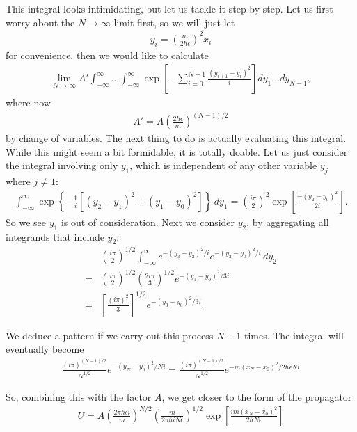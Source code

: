 \documentclass{book}
\theoremstyle{definition}
\newcommand{\f}[2]{\frac{#1}{#2}}
\newcommand{\lp}{\left(}
\newcommand{\rp}{\right)}
\newcommand{\lb}{\left[}
\newcommand{\rb}{\right]}
\newcommand{\lc}{\left\{}
\newcommand{\rc}{\right\}}
\begin{document}
This integral looks intimidating, but let us tackle it step-by-step. Let us first worry about the $N\to \infty$ limit first, so we will just let
\begin{align}
y_i = \lp \f{m}{2\hbar\epsilon}\rp^2 x_i
\end{align}
for convenience, then we would like to calculate
\begin{align}
\lim_{N \to \infty} A' \int_{-\infty}^{\infty} \dots \int_{-\infty}^{\infty} \exp \lb -\sum_{i=0}^{N-1} \f{(y_{i+1} - y_i)^2}{i} \rb dy_1\dots dy_{N-1},
\end{align}
where now
\begin{align}
A' = A\lp \f{2\hbar\epsilon}{m}\rp^{(N-1)/2}
\end{align}
by change of variables. The next thing to do is actually evaluating this integral. While this might seem a bit formidable, it is totally doable. Let us just consider the integral involving only $y_1$, which is independent of any other variable $y_j$ where $j\neq 1$:
\begin{align}
\int_{-\infty}^\infty    \exp \lc -\f{1}{i}\lb (y_2 - y_1)^2 + (y_1 - y_0)^2 \rb  \rc\,dy_1  = \lp \f{i\pi}{2} \rp^2 \exp \lb \f{-(y_2 - y_0)^2}{2i} \rb.
\end{align}
So we see $y_1$ is out of consideration. Next we consider $y_2$, by aggregating all integrands that include $y_2$:
\begin{align}
&\lp \f{i\pi}{2} \rp^{1/2} \int^\infty_{-\infty} e^{-(y_3 - y_2)^2/i}e^{-(y_2 - y_0)^2/i} \,dy_2\\
=& \lp \f{i\pi}{2} \rp^{1/2} \lp \f{2i\pi}{3} \rp^{1/2} e^{-(y_3 - y_0)^2 / 3i}\\
=& \lb \f{(i\pi)^2}{3} \rb^{1/2} e^{-(y_3 - y_0)^2 / 3i}.
\end{align}

We deduce a pattern if we carry out this process $N-1$ times. The integral will eventually become
\begin{align}
\boxed{\f{(i\pi)^{(N-1)/2}}{N^{1/2}} e^{-(y_N - y_0)^2 / Ni} = \f{(i\pi)^{(N-1)/2}}{N^{1/2}} e^{-m(x_N - x_0)^2 / 2\hbar\epsilon Ni}}
\end{align}

So, combining this with the factor $A$, we get closer to the form of the propagator
\begin{align}
\boxed{U = A\lp \f{2\pi\hbar \epsilon i}{m} \rp^{N/2} \lp \f{m}{2\pi\hbar i N \epsilon} \rp^{1/2}  \exp \lb \f{im(x_N - x_0)^2}{2\hbar N \epsilon} \rb} 
\end{align}
\end{document}
